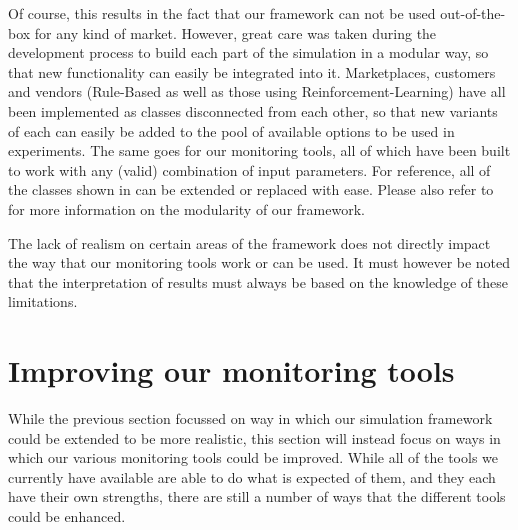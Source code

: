 Of course, this results in the fact that our framework can not be used out-of-the-box for any kind of market. However, great care was taken during the development process to build each part of the simulation in a modular way, so that new functionality can easily be integrated into it. Marketplaces, customers and vendors (Rule-Based as well as those using Reinforcement-Learning) have all been implemented as classes disconnected from each other, so that new variants of each can easily be added to the pool of available options to be used in experiments. The same goes for our monitoring tools, all of which have been built to work with any (valid) combination of input parameters. For reference, all of the classes shown in  can be extended or replaced with ease. Please also refer to \cite{LeoThesis} for more information on the modularity of our framework.

The lack of realism on certain areas of the framework does not directly impact the way that our monitoring tools work or can be used. It must however be noted that the interpretation of results must always be based on the knowledge of these limitations.

\section{Improving our monitoring tools}

While the previous section focussed on way in which our simulation framework could be extended to be more realistic, this section will instead focus on ways in which our various monitoring tools could be improved. While all of the tools we currently have available are able to do what is expected of them, and they each have their own strengths, there are still a number of ways that the different tools could be enhanced.


